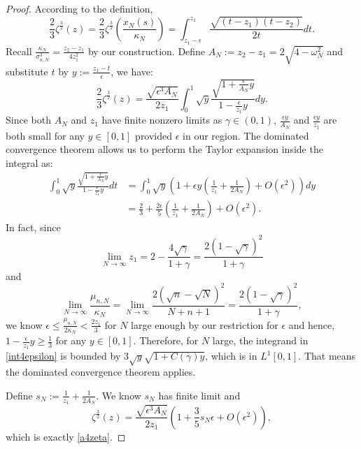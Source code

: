 \documentclass[11pt]{article}
\numberwithin{equation}{section}%
\numberwithin{theorem}{section}
\begin{document}
\begin{proof}
   According to the definition, 
\begin{equation*}
        \frac{2}{3}\zeta^{\frac{3}{2}}(z)=\frac{2}{3}\zeta^{\frac{3}{2}}\left(\frac{x_N(s)}{\kappa_N}\right)=\int_{z_1-\epsilon}^{z_1}\frac{\sqrt{(t-z_1)(t-z_2)}}{2t}dt.
\end{equation*}
Recall $\frac{\kappa_N}{\sigma_{n,N}^3}=\frac{z_2-z_1}{4z_1^2}$ by our construction. Define $A_N:=z_2-z_1=2\sqrt{4-\omega_N^2}$ and substitute $t$ by $y:=\frac{z_1-t}{\epsilon}$, we have:
\begin{equation*}
          \frac{2}{3}\zeta^{\frac{3}{2}}(z)=\frac{\sqrt{\epsilon^3A_N}}{2z_1}\int_0^1\sqrt y\frac{\sqrt{1+\frac{\epsilon}{A_N}y}}{1-\frac{\epsilon}{z_1}y}dy.
\end{equation*}
Since both $A_N$ and $z_1$ have finite nonzero limits as $\gamma\in(0,1)$, $\frac{\epsilon y}{A_N}$ and $\frac{\epsilon y}{z_1}$ are both small for any $y\in[0,1]$ provided $\epsilon$ in our region. The dominated convergence theorem allows us to perform the Taylor expansion inside the integral as:
\begin{equation}\label{int4epsilon}
\begin{split}
    \int_0^1\sqrt y\frac{\sqrt{1+\frac{\epsilon}{A_N}y}}{1-\frac{\epsilon}{z_1}y}dt&=\int_0^1\sqrt{y}\left(1+\epsilon y(\frac{1}{z_1}+\frac{1}{2A_N})+O(\epsilon^2)\right)dy\\
    &=\frac{2}{3}+\frac{2\epsilon}{5}\left(\frac{1}{z_1}+\frac{1}{2A_N}\right)+O(\epsilon^2).
\end{split}
\end{equation}
In fact, since
\begin{equation*}
    \lim_{N\rightarrow\infty}z_1=2-\frac{4\sqrt\gamma}{1+\gamma}=\frac{2(1-\sqrt\gamma)^2}{1+\gamma}
\end{equation*}
and
\begin{equation*}
    \lim_{N\rightarrow\infty}\frac{\mu_{n,N}}{\kappa_N}=\lim_{N\rightarrow\infty}\frac{2(\sqrt n-\sqrt N)^2}{N+n+1}=\frac{2(1-\sqrt\gamma)^2}{1+\gamma},
\end{equation*}
 we know $\epsilon\le\frac{\mu_{n,N}}{2\kappa_N}<\frac{2z_1}{3}$ for $N$ large enough by our restriction for $\epsilon$ and hence, $1-\frac{\epsilon}{z_1}y\ge \frac{1}{3}$ for any $y\in[0,1]$. Therefore, for $N$ large, the integrand in \eqref{int4epsilon} is bounded by $3\sqrt y\sqrt{1+C(\gamma)y}$, which is in $L^1[0,1]$. That means the dominated convergence theorem applies.

Define $s_N:=\frac{1}{z_1}+\frac{1}{2A_N}$. We know $s_N$ has finite limit and
\begin{equation*}
    \zeta^{\frac{3}{2}}(z)=\frac{\sqrt{\epsilon^3A_N}}{2z_1}\left(1+\frac{3}{5}s_N\epsilon+O(\epsilon^2)\right),
\end{equation*}
which is exactly \eqref{a4zeta}.


\end{proof}
\end{document}
